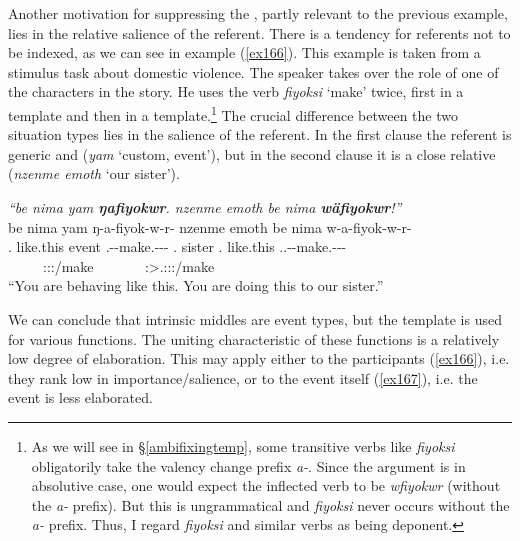 Another motivation for suppressing the , partly relevant to the previous example, lies in the relative salience of the referent. There is a tendency for  referents not to be indexed, as we can see in example (\ref{ex166}). This example is taken from a stimulus task about domestic violence. The speaker takes over the role of one of the characters in the story. He uses the verb \emph{fiyoksi} `make' twice, first in a  template and then in a  template.\footnote{As we will see in {\S}\ref{ambifixingtemp}, some transitive verbs like \emph{fiyoksi} obligatorily take the valency change prefix \emph{a-}. Since the argument is in absolutive case, one would expect the inflected verb to be \emph{wfiyokwr} (without the \emph{a-} prefix). But this is ungrammatical and \emph{fiyoksi} never occurs without the \emph{a-} prefix. Thus, I regard \emph{fiyoksi} and similar verbs as being deponent.} The crucial difference between the two situation types lies in the salience of the referent. In the first clause the referent is generic and  (\emph{yam} `custom, event'), but in the second clause it is a close relative (\emph{nzenme emoth} `our sister').

\begin{exe}
	\ex \emph{``be nima yam \textbf{ŋafiyokwr}. nzenme emoth be nima \textbf{wäfiyokwr}!''}\\
	\glll be nima yam ŋ-a-fiyok-w-r-\Zero{} nzenme emoth be nima w-a-fiyok-w-r-\Zero{}\\
	\Ssg.{\Erg} like.this event \M.\Alph-\Vc-make.\Ext-\Ndu-\Lk-\Stsg{} \Fnsg.{\Poss} sister \Ssg.{\Erg} like.this \Tsg.\F.\Alph-\Vc-make.\Ext-\Ndu-\Lk-\Stsg\\
	~ ~ ~ {\footnotesize \Stsg:\Sbj:\Nonpast:\Ipfv/make} ~ ~ ~ ~ {\footnotesize \Stsg:\Sbj>\Tsg.\F:\Obj:\Nonpast:\Ipfv/make}\\
	\trans ``You are behaving like this. You are doing this to our sister.''\\ 
	\label{ex166}
\end{exe}

We can conclude that intrinsic middles are  event types, but the  template is used for various functions. The uniting characteristic of these functions is a relatively low degree of elaboration. This may apply either to the participants (\ref{ex166}), i.e. they rank low in importance/salience, or to the event itself (\ref{ex167}), i.e. the event is less elaborated.

